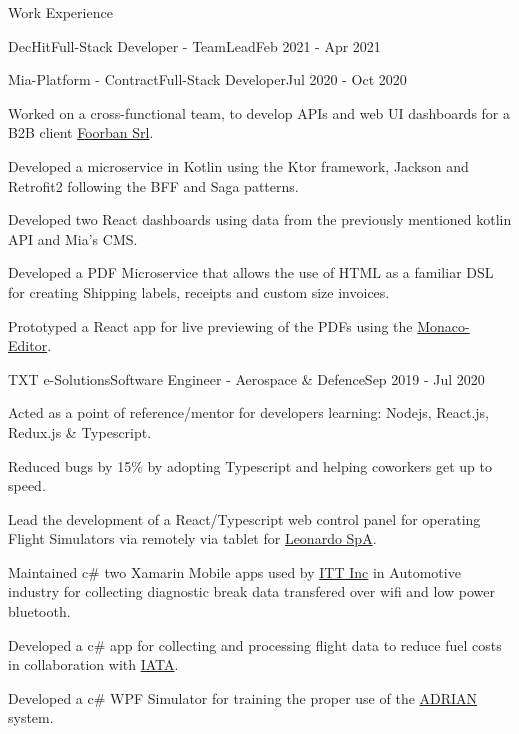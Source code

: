 \documentclass{article}
\newlength{\tabin}
\newlength{\secsep}
\newcommand{\lineunder}{\vspace*{-8pt} \\ \hspace*{-6pt} \hrulefill \\ \vspace*{-15pt}}
\newenvironment{tabbedsection}[1]{
  \begin{list}{}{
      \setlength{\itemsep}{0pt}
      \setlength{\labelsep}{0pt}
      \setlength{\labelwidth}{0pt}
      \setlength{\leftmargin}{\tabin}
      \setlength{\rightmargin}{\tabin}
      \setlength{\listparindent}{0pt}
      \setlength{\parsep}{0pt}
      \setlength{\parskip}{0pt}
      \setlength{\partopsep}{0pt}
      \setlength{\topsep}{#1}
    }
  \item[]
}{\end{list}}
\newenvironment{resume_section}[1]{
  \filbreak
  \vspace{2\secsep}
  \textsc{\large#1}
  \lineunder
  \begin{tabbedsection}{\secsep}
}{\end{tabbedsection}}
\newenvironment{subitems}{
  \renewcommand{\labelitemi}{-}
  \begin{itemize}
      \setlength{\labelsep}{1em}
}{\end{itemize}}
\newenvironment{resume_employer}[4]{
  \vspace{\secsep}
  \textbf{#1} \\ 
  \indent {\small #2} \hfill {\footnotesize#3 (#4)}

}
\newenvironment{resume_work_bullets}{
  \begin{tabbedsection}{0pt}
  \begin{subitems}
}{\end{subitems}\end{tabbedsection}}
\begin{document}
\begin{resume_section}{Work Experience}
\begin{resume_employer}{DecHit}{Full-Stack Developer - TeamLead}{}{Feb 2021 - Apr 2021}
\begin{resume_work_bullets}
      \end{resume_work_bullets}
    \end{resume_employer}
    \begin{resume_employer}{Mia-Platform - Contract}{Full-Stack Developer}{}{Jul 2020 - Oct 2020}
      \begin{resume_work_bullets}
          \item Worked on a cross-functional team, to develop APIs and web UI dashboards for a B2B client \href{https://www.foorban.com}{Foorban Srl}.
          \item Developed a microservice in Kotlin using the Ktor framework, Jackson and Retrofit2 following the BFF and Saga patterns.
          \item Developed two React dashboards using data from the previously mentioned kotlin API and Mia's CMS.
          \item Developed a PDF Microservice that allows the use of HTML as a familiar DSL for creating Shipping labels, receipts and custom size invoices.
          \item Prototyped a React app for live previewing of the PDFs using the \href{https://github.com/microsoft/monaco-editor}{Monaco-Editor}.
      \end{resume_work_bullets}
    \end{resume_employer}
    \begin{resume_employer}{TXT e-Solutions}{Software Engineer - Aerospace \& Defence}{}{Sep 2019 - Jul 2020}
      \begin{resume_work_bullets}
          \item Acted as a point of reference/mentor for developers learning: Nodejs, React.js, Redux.js \& Typescript.
          \item Reduced bugs by 15\% by adopting Typescript and helping coworkers get up to speed.
          \item Lead the development of a React/Typescript web control panel for operating Flight Simulators via remotely via tablet for \href{https://www.leonardocompany.com/en/home}{Leonardo SpA}.
          \item Maintained c\# two Xamarin Mobile apps used by \href {https://www.itt.com/home}{ITT Inc} in Automotive industry for collecting diagnostic break data transfered over wifi and low power bluetooth.
          \item Developed a c\# app for collecting and processing flight data to reduce fuel costs in collaboration with \href{http://pace.txtgroup.com/products/flight-operations/pacelab-flight-profile-optimizer/}{IATA}.
          \item Developed a c\# WPF Simulator for training the proper use of the \href{https://www.elt-roma.com/product/adrian}{ADRIAN} system.
      \end{resume_work_bullets}
    \end{resume_employer}
    
  \end{resume_section}
\end{document}
